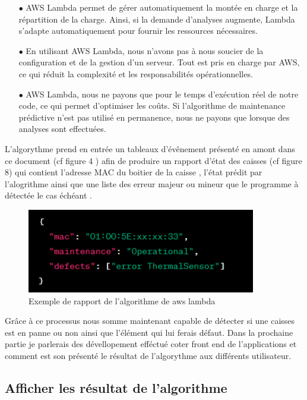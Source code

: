 \documentclass[12pt]{article}
\begin{document}
\begin{itemize}
    \item[$\bullet$]  AWS Lambda permet de gérer automatiquement la montée en charge et la réparti\-tion de la charge. Ainsi, si la demande d'analyses augmente, Lambda s'adapte automatiquement pour fournir les ressources nécessaires.

    \item[$\bullet$]  En utilisant AWS Lambda, nous n'avons pas à nous soucier de la configuration et de la gestion d'un serveur. Tout est pris en charge par AWS, ce qui réduit la complexité et les responsabilités opérationnelles.

    \item[$\bullet$]  AWS Lambda, nous ne payons que pour le temps d'exécution réel de notre code, ce qui permet d'optimiser les coûts. Si l'algorithme de maintenance prédictive n'est pas utilisé en permanence, nous ne payons que lorsque des analyses sont effectuées.
\end{itemize}


\justify
\text L'algorythme prend en entrée un tableaux d'évênement présenté en amont dans ce document (cf figure 4 )  afin de produire un rapport d'état des caisses (cf figure 8) qui contient l'adresse MAC du boitier de la caisse , l'état prédit par l'alogrithme ainsi que une liste des erreur majeur ou mineur que le programme à détectée le cas échéant . 
\justify

\centering
\begin{figure}[H]
    \centering
    \includegraphics[width=10cm]{img/json-report.png.png}
    \caption{Exemple de rapport de l'algorithme de aws lambda}
    \label{fig:enter-label}
\end{figure}


\justify
\text Grâce à ce processus nous somme maintenant capable de détecter si une caisses est en panne ou non ainsi que l'élément qui lui ferais défaut. Dans la prochaine partie je parlerais des dévellopement efféctué coter front end de l'applications et comment est son présenté le résultat de l'algorythme aux différents utilisateur.

\subsection{Afficher les résultat de l'algorithme}
\end{document}
